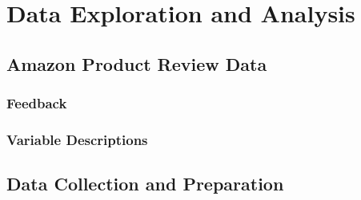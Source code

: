 
\chapter{Data Exploration and Analysis} %

\label{Chapter3} %



\section{Amazon Product Review Data}
\label{chp3-sec1}




\subsection{Feedback}
\label{chp3-sec1.1}



\subsection{Variable Descriptions}
\label{chp3-sec1.2}



\section{Data Collection and Preparation}
\label{chp3-sec2}




